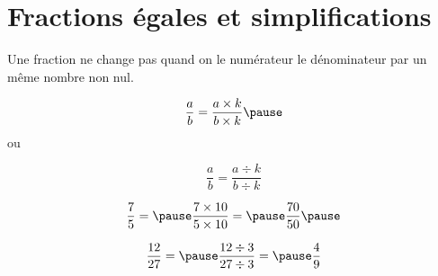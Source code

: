 \documentclass[xcolor={dvipsnames}]{beamer}
\begin{document}
%			
%		
%	

\section{Fractions égales et simplifications}


\begin{frame}
	\begin{myprop}
		Une fraction ne change pas quand on  le numérateur  le dénominateur par un même nombre non nul.\pause
		
				
			\begin{equation*}
				\dfrac{a}{b} = \dfrac{a \times k}{b \times k} \pause
			\end{equation*}
			ou 
			
			\begin{equation*}
				\dfrac{a}{b} = \dfrac{a \div k}{b \div k} 
			\end{equation*}
		
	\end{myprop}


	\begin{myexs}
		
			
			\begin{equation*}
			\dfrac{\num{7}}{\num{5}} = \pause \dfrac{7 \times 10 }{5 \times 10 } = \pause \dfrac{\num{70}}{\num{50}} \pause
			\end{equation*}
			
			
			\begin{equation*}
			\dfrac{\num{12}}{\num{27}} = \pause \dfrac{\num{12} \div 3 }{\num{27} \div 3 } = \pause \dfrac{\num{4}}{\num{9}} 
			\end{equation*}
	\end{myexs}
\end{frame}
\end{document}
